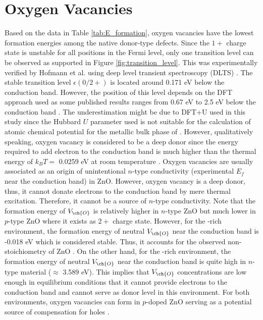 \clearpage

\section{Oxygen Vacancies}
Based on the data in Table \ref{tab:E_formation}, oxygen vacancies have the lowest formation energies among the native donor-type defects. Since the $1+$ charge state is unstable for all positions in the Fermi level, only one transition level can be observed as supported in Figure \ref{fig:transition_level}. This was experimentally verified by Hofmann et al. using deep level transient spectroscopy (DLTS) \citep{Hofmann2007}.
The stable transition level $\epsilon(0/2+)$ is located around 0.171 eV below the conduction band. However, the position of this level depends on the DFT approach used as some published results ranges from 0.67 eV to 2.5 eV below the conduction band \citep{Lany2010, Oba2008, Paudel2008}. The underestimation might be due to DFT+U used in this study since the Hubbard $U$ parameter used is not suitable for the calculation of atomic chemical potential for the metallic bulk phase of  \citep{Lany2010}. However, qualitatively speaking, oxygen vacancy is considered to be a deep donor since the energy required to add electron to the conduction band is much higher than the thermal energy of $k_B T = $ 0.0259 eV at room temperature \citep{Freysoldt2014}. Oxygen vacancies are usually associated as an origin of unintentional $n$-type conductivity (experimental $E_f$ near the conduction band) in ZnO. However, oxygen vacancy is a deep donor, thus, it cannot donate electrons to the conduction band by mere thermal excitation. Therefore, it cannot be a source of $n$-type conductivity. Note that the formation energy of $V_{\ch{O}}$ is relatively higher in  $n$-type ZnO  but much lower in $p$-type ZnO where it exists as $2+$ charge state. However, for the -rich environment, the formation energy of neutral $V_{\ch{O}}$  near the conduction band is -0.018 eV which is considered stable. Thus, it accounts for the observed non-stoichiometry of ZnO  \citep{Oba2011}. On the other hand, for the -rich environment, the formation energy of neutral $V_{\ch{O}}$  near the conduction band is quite high in $n$-type material ($\approx$ 3.589 eV). This implies that  $V_{\ch{O}}$ concentrations are low enough in equilibrium conditions that it cannot provide electrons to the conduction band and cannot serve as donor level in this environment. For both environments, oxygen vacancies can form in $p$-doped ZnO serving as a potential source of compensation for holes \citep{Janotti2007}.


